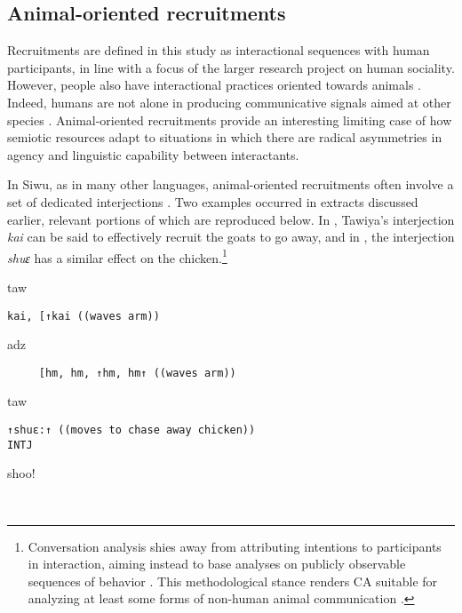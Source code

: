 \documentclass[output=paper]{langsci/langscibook}
\begin{document}
\subsection{Animal-oriented recruitments}

Recruitments are defined in this study as interactional sequences with human participants, in line with a focus of the larger research project on human sociality. However, people also have interactional practices oriented towards animals \citep{bynon_domestic_1976,spottiswoode_reciprocal_2016}. Indeed, humans are not alone in producing communicative signals aimed at other species \citep{krebs_animal_1984}. Animal-oriented recruitments provide an interesting limiting case of how semiotic resources adapt to situations in which there are radical asymmetries in agen\-cy and linguistic capability between interactants.

In Siwu, as in many other languages, animal-oriented recruitments often involve a set of dedicated interjections \citep{ameka_interjections:_1992}. Two examples occurred in extracts discussed earlier, relevant portions of which are reproduced below. In , Tawiya’s interjection \textit{kai} can be said to effectively recruit the goats to go away, and in  , the interjection \textit{shuɛ} has a similar effect on the chicken.\footnote{Conversation analysis shies away from attributing intentions to participants in interaction, aiming instead to base analyses on publicly observable sequences of behavior \citep{heritage_intention_1990}. This methodological stance renders CA suitable for analyzing at least some forms of non-human animal communication \citep{rossano_sequence_2013}.}

\vspace{2mm}
%
\begin{transbox}{5}{taw}
\begin{verbatim}
kai, [↑kai ((waves arm))
\end{verbatim}
\end{transbox}
%
\begin{transbox}{6}{adz}
\begin{verbatim}
     [hm, hm, ↑hm, hm↑ ((waves arm))
\end{verbatim}
\end{transbox}
%

\vspace{2mm}
%
\begin{transbox}{4}{taw}
\begin{verbatim}
↑shuɛ:↑ ((moves to chase away chicken))
INTJ
\end{verbatim}
shoo!
\end{transbox}
%
\\
\end{document}
